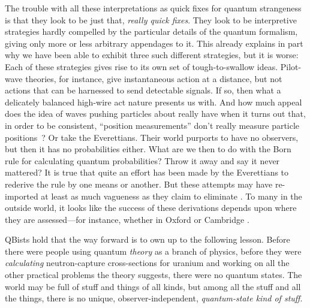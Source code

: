 \documentclass[aps,pra,superscriptaddress,10pt,tightenlines,twocolumn,nofootinbib]{revtex4}
\begin{document}
The trouble with all these interpretations as quick fixes for quantum strangeness is that they look to be just that, {\it really quick fixes}.  They look to be interpretive strategies hardly compelled by the particular details of the quantum formalism, giving only more or less arbitrary appendages to it.  This already explains in part why we have been able to exhibit three such different strategies, but it is worse:  Each of these strategies gives rise to its own set of tough-to-swallow ideas.  Pilot-wave theories, for instance, give instantaneous action at a distance, but not actions that can be harnessed to send detectable signals.  If so, then what a delicately balanced high-wire act nature presents us with.  And how much appeal does the idea of waves pushing particles about really have when it turns out that, in order to be consistent, ``position measurements'' don't really measure particle positions~\cite{Gisin15}?  Or take the Everettians.  Their world purports to have no observers, but then it has no probabilities either.  What are we then to do with the Born rule for calculating quantum probabilities?  Throw it away and say it never mattered?  It is true that quite an effort has been made by the Everettians to rederive the rule by one means or another.  But these attempts may have re-imported at least as much vagueness as they claim to eliminate \cite{Caves05, Kent14, Kastner14, Adlam14, Jansson16}. To many in the outside world, it looks like the success of these derivations depends upon where they are assessed---for instance, whether in Oxford \cite{Saunders05, Wallace09} or Cambridge \cite{Price08, Kent09}.

QBists hold that the way forward is to own up to the following lesson.  Before there were people using quantum {\it theory\/} as a branch of physics, before they were {\it calculating\/} neutron-capture cross-sections for uranium and working on all the other practical problems the theory suggests, there were no quantum states.  The world may be full of stuff and things of all kinds, but among all the stuff and all the things, there is no unique, observer-independent, {\it quantum-state kind of stuff}.
\end{document}
